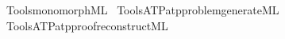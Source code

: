 \begin{isabellebody}
\isamarkupfalse%
\ {\isacartoucheopen}Tools{\isacharslash}{\kern0pt}monomorph{\isachardot}{\kern0pt}ML{\isacartoucheclose}\isanewline
{}\isamarkupfalse%
\ {\isacartoucheopen}Tools{\isacharslash}{\kern0pt}ATP{\isacharslash}{\kern0pt}atp{\isacharunderscore}{\kern0pt}problem{\isacharunderscore}{\kern0pt}generate{\isachardot}{\kern0pt}ML{\isacartoucheclose}\isanewline
{}\isamarkupfalse%
\ {\isacartoucheopen}Tools{\isacharslash}{\kern0pt}ATP{\isacharslash}{\kern0pt}atp{\isacharunderscore}{\kern0pt}proof{\isacharunderscore}{\kern0pt}reconstruct{\isachardot}{\kern0pt}ML{\isacartoucheclose}%
\endisatagML
{\isafoldML}%
%
\isadelimML
\isanewline
%
\endisadelimML
%
\isadelimtheory
\isanewline
%
\endisadelimtheory
%
\isatagtheory
{}\isamarkupfalse%
%
\endisatagtheory
{\isafoldtheory}%
%
\isadelimtheory
%
\endisadelimtheory
%
\end{isabellebody}%
\endinput
